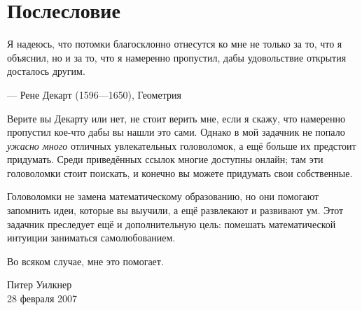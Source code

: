 \chapter{Послесловие}


\setlength{\epigraphwidth}{.83\textwidth}
\epigraph{Я надеюсь, что потомки благосклонно отнесутся ко мне не только за то, что я объяснил, но и за то, что я намеренно пропустил, дабы удовольствие открытия досталось другим.}{--- Рене Декарт (1596---1650), Геометрия}


Верите вы Декарту или нет, не стоит верить мне, если я скажу, что намеренно пропустил кое-что дабы вы нашли это сами.
Однако в мой задачник не попало \emph{ужасно много} отличных увлекательных головоломок, а ещё больше их предстоит придумать.
Среди приведённых ссылок многие доступны онлайн; там эти головоломки стоит поискать,
и конечно вы можете придумать свои собственные.

Головоломки не замена математическому образованию, но они помогают запомнить идеи, которые вы выучили, а ещё развлекают и развивают ум.
Этот задачник преследует ещё и дополнительную цель:
помешать математической интуиции заниматься самолюбованием.

Во всяком случае, мне это помогает.

\begin{flushright}
Питер Уилкнер\\
28 февраля 2007
\end{flushright}
